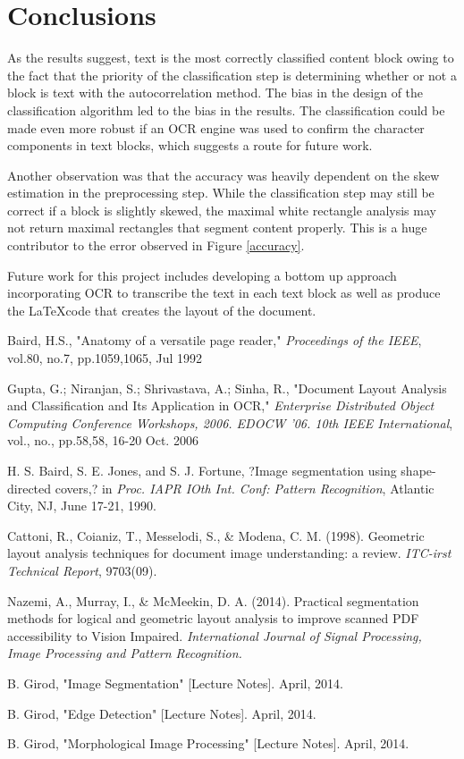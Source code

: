\documentclass{report}
\begin{document}
\chapter{Conclusions}
As the results suggest, text is the most correctly classified content block owing to the fact that the priority of the classification step is determining whether or not a block is text with the autocorrelation method. The bias in the design of the classification algorithm led to the bias in the results. The classification could be made even more robust if an OCR engine was used to confirm the character components in text blocks, which suggests a route for future work.


Another observation was that the accuracy was heavily dependent on the skew estimation in the preprocessing step. While the classification step may still be correct if a block is slightly skewed, the maximal white rectangle analysis may not return maximal rectangles that segment content properly. This is a huge contributor to the error observed in Figure \ref{accuracy}.


Future work for this project includes developing a bottom up approach incorporating OCR to transcribe the text in each text block as well as produce the \LaTeX code that creates the layout of the document.

\begin{thebibliography}{9}

Baird, H.S., "Anatomy of a versatile page reader," \emph{Proceedings of the IEEE}, vol.80, no.7, pp.1059,1065, Jul 1992

Gupta, G.; Niranjan, S.; Shrivastava, A.; Sinha, R., "Document Layout Analysis and Classification and Its Application in OCR," \emph{Enterprise Distributed Object Computing Conference Workshops, 2006. EDOCW '06. 10th IEEE International}, vol., no., pp.58,58, 16-20 Oct. 2006

H. S. Baird, S. E. Jones, and S. J. Fortune, ?Image segmentation using shape-directed covers,? in \emph{Proc. IAPR IOth Int. Conf: Pattern Recognition}, Atlantic City, NJ, June 17-21, 1990.

Cattoni, R., Coianiz, T., Messelodi, S., & Modena, C. M. (1998). Geometric layout analysis techniques for document image understanding: a review. \emph{ITC-irst Technical Report}, 9703(09).

Nazemi, A., Murray, I., & McMeekin, D. A. (2014). Practical segmentation methods for logical and geometric layout analysis to improve scanned PDF accessibility to Vision Impaired. \emph{International Journal of Signal Processing, Image Processing and Pattern Recognition.}

B. Girod, "Image Segmentation" [Lecture Notes]. April, 2014.

B. Girod, "Edge Detection" [Lecture Notes]. April, 2014.

B. Girod, "Morphological Image Processing" [Lecture Notes]. April, 2014.

\end{thebibliography}
\end{document}
